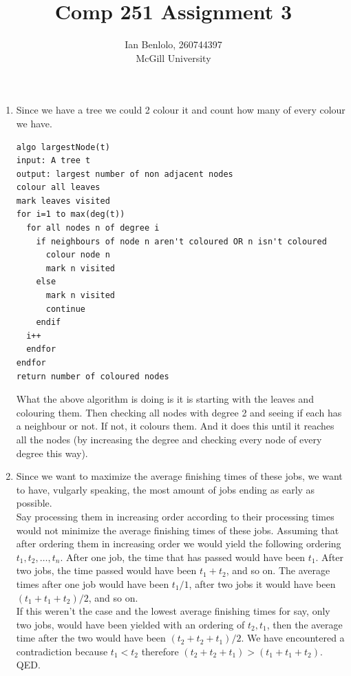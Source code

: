 
\usepackage{cancel}
\usepackage{enumerate}
\usepackage{verbatim}
\usepackage{graphicx}
\usepackage{appendix}
\title{Comp 251 Assignment 3}
\author{Ian Benlolo, 260744397 \\ McGill University\\}


\maketitle
\begin{enumerate}[1.]
\item 
Since we have a tree we could 2 colour it and count how many of every colour we have. 

\begin{verbatim}
algo largestNode(t)
input: A tree t
output: largest number of non adjacent nodes
colour all leaves
mark leaves visited
for i=1 to max(deg(t))
  for all nodes n of degree i
    if neighbours of node n aren't coloured OR n isn't coloured
      colour node n
      mark n visited
    else
      mark n visited
      continue
    endif
  i++
  endfor
endfor
return number of coloured nodes
\end{verbatim}
What the above algorithm is doing is it is starting with the leaves and colouring them. Then checking all nodes with degree 2 and seeing if each has a neighbour or not. If not, it colours them. And it does this until it reaches all the nodes (by increasing the degree and checking every node of every degree this way). \\

\item
Since we want to maximize the average finishing times of these jobs, we want to have, vulgarly speaking, the most amount of jobs ending as early as possible. \\

Say processing them in increasing order according to their processing times would not minimize the average finishing times of these jobs. Assuming that after ordering them in increasing order we would yield the following ordering $t_1, t_2,\dots, t_n$. After one job, the time that has passed would have been $t_1$. After two jobs, the time passed would have been $t_1+t_2$, and so on. The average times after one job would have been $t_1/1$, after two jobs it would have been $(t_1+t_1+t_2)/2$, and so on.\\
If this weren't the case and the lowest average finishing times for say, only two jobs, would have been yielded with an ordering of $t_2, t_1$, then the average time after the two would have been $(t_2+t_2+t_1)/2$. We have encountered a contradiction because $t_1 < t_2$ therefore $(t_2+t_2+t_1)> (t_1+t_1+t_2)$. QED.



\end{enumerate}
